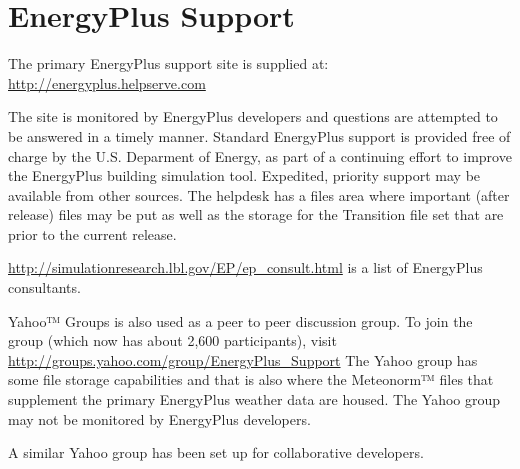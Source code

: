 \section{EnergyPlus Support}\label{energyplus-support}

The primary EnergyPlus support site is supplied at: \url{http://energyplus.helpserve.com}

The site is monitored by EnergyPlus developers and questions are attempted to be answered in a timely manner. Standard EnergyPlus support is provided free of charge by the U.S. Deparment of Energy, as part of a continuing effort to improve the EnergyPlus building simulation tool. Expedited, priority support may be available from other sources. The helpdesk has a files area where important (after release) files may be put as well as the storage for the Transition file set that are prior to the current release.

\url{http://simulationresearch.lbl.gov/EP/ep_consult.html} is a list of EnergyPlus consultants.

Yahoo™ Groups is also used as a peer to peer discussion group. To join the group (which now has about 2,600 participants), visit \href{http://groups.yahoo.com/EnergyPlus_Support}{http://groups.yahoo.com/group/EnergyPlus\_Support} The Yahoo group has some file storage capabilities and that is also where the Meteonorm™ files that supplement the primary EnergyPlus weather data are housed. The Yahoo group may not be monitored by EnergyPlus developers.

A similar Yahoo group has been set up for collaborative developers.
